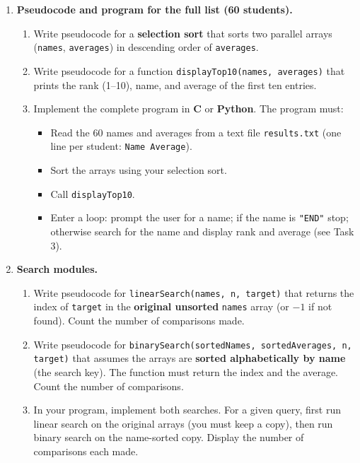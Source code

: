 \documentclass[11pt]{article}
\begin{document}
\begin{enumerate}
    \item \textbf{Pseudocode and program for the full list (60 students).}
    \begin{enumerate}
        \item Write pseudocode for a \textbf{selection sort} that sorts two parallel arrays (\texttt{names}, \texttt{averages}) in descending order of \texttt{averages}.
        \item Write pseudocode for a function \texttt{displayTop10(names, averages)} that prints the rank (1--10), name, and average of the first ten entries.
        \item Implement the complete program in \textbf{C} or \textbf{Python}. The program must:
              \begin{itemize}
                  \item Read the 60 names and averages from a text file \texttt{results.txt} (one line per student: \texttt{Name Average}).
                  \item Sort the arrays using your selection sort.
                  \item Call \texttt{displayTop10}.
                  \item Enter a loop: prompt the user for a name; if the name is \texttt{"END"} stop; otherwise search for the name and display rank and average (see Task 3).
              \end{itemize}
    \end{enumerate}

    \item \textbf{Search modules.}
    \begin{enumerate}
        \item Write pseudocode for \texttt{linearSearch(names, n, target)} that returns the index of \texttt{target} in the \textbf{original unsorted} \texttt{names} array (or $-1$ if not found). Count the number of comparisons made.
        \item Write pseudocode for \texttt{binarySearch(sortedNames, sortedAverages, n, target)} that assumes the arrays are \textbf{sorted alphabetically by name} (the search key). The function must return the index and the average. Count the number of comparisons.
        \item In your program, implement both searches. For a given query, first run linear search on the original arrays (you must keep a copy), then run binary search on the name-sorted copy. Display the number of comparisons each made.
    \end{enumerate}


\end{enumerate}
\end{document}
